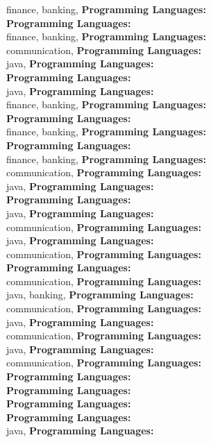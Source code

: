 finance, banking, \textbf{Programming Languages:} \\
\textbf{Programming Languages:} \\
finance, banking, \textbf{Programming Languages:} \\
communication, \textbf{Programming Languages:} \\
java, \textbf{Programming Languages:} \\
\textbf{Programming Languages:} \\
java, \textbf{Programming Languages:} \\
finance, banking, \textbf{Programming Languages:} \\
\textbf{Programming Languages:} \\
finance, banking, \textbf{Programming Languages:} \\
\textbf{Programming Languages:} \\
finance, banking, \textbf{Programming Languages:} \\
communication, \textbf{Programming Languages:} \\
java, \textbf{Programming Languages:} \\
\textbf{Programming Languages:} \\
java, \textbf{Programming Languages:} \\
communication, \textbf{Programming Languages:} \\
java, \textbf{Programming Languages:} \\
communication, \textbf{Programming Languages:} \\
\textbf{Programming Languages:} \\
communication, \textbf{Programming Languages:} \\
java, banking, \textbf{Programming Languages:} \\
communication, \textbf{Programming Languages:} \\
java, \textbf{Programming Languages:} \\
communication, \textbf{Programming Languages:} \\
java, \textbf{Programming Languages:} \\
communication, \textbf{Programming Languages:} \\
\textbf{Programming Languages:} \\
\textbf{Programming Languages:} \\
\textbf{Programming Languages:} \\
\textbf{Programming Languages:} \\
java, \textbf{Programming Languages:} \\
